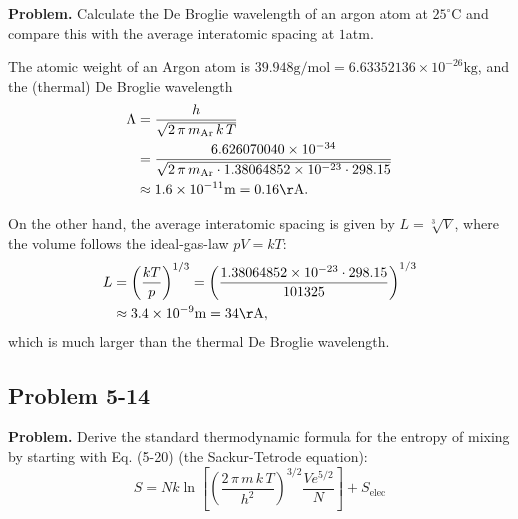 \documentclass[twocolumn, 10pt]{article}
\numberwithin{equation}{section}
\newenvironment{problem}
{\par\medskip \color{problue}
  \textbf{Problem. }\ignorespaces}
{\medskip}
\newenvironment{solution}[1][\empty]
{\par\medskip\sffamily
  \textbf{\ifx\empty#1{Solution.}\relax\else{#1}\fi} \ignorespaces}
{\medskip}
\begin{document}
\begin{problem}
  Calculate the De Broglie wavelength of an argon atom at $25^{\circ}$C
  and compare this with the average interatomic spacing at $1$atm.
\end{problem}

\begin{solution}
The atomic weight of an Argon atom is
$39.948 \mathrm{g/mol} = 6.63352136\times 10^{-26} \mathrm{kg}$,
and the (thermal) De Broglie wavelength
\begin{align*}
\Lambda
  &= \frac{h}{ \sqrt{2\,\pi\,m_\mathrm{Ar}\,k\,T} }
  \\
  &= \frac{ 6.626070040 \times 10^{-34} }
  { \sqrt{2 \, \pi \, m_\mathrm{Ar} \cdot 1.38064852 \times 10^{-23} \cdot 298.15} }
  \\
  &\approx 1.6\times10^{-11}\mathrm{m} = 0.16\mathrm{\AA}.
\end{align*}

On the other hand,
the average interatomic spacing
  is given by $L = \sqrt[3]{V}$,
where the volume follows the ideal-gas-law $pV = kT$:
\begin{align*}
  L
  &= \left(\frac{ kT } { p} \right)^{1/3}
  = \left(
  \frac{ 1.38064852 \times 10^{-23} \cdot 298.15 }
  { 101325 } \right)^{1/3}
  \\
  &\approx 3.4\times10^{-9} \mathrm{m}
  = 34\mathrm{\AA},
\end{align*}
which is much larger than the thermal De Broglie wavelength.
%
\end{solution}

\subsection{Problem 5-14}

\begin{problem}
  Derive the standard thermodynamic formula for the entropy of mixing
  by starting with Eq. (5-20) (the Sackur-Tetrode equation):
  \begin{equation}
    S = N k \ln \left[
      \left( \frac{ 2 \, \pi \, m \, k \, T } { h^2 }
      \right)^{3/2}
      \frac{ V e^{5/2} } { N }
      \right] + S_\mathrm{elec}
    \tag{5-20}
    \label{eq:Sstd}
  \end{equation}
\end{problem}
\end{document}
